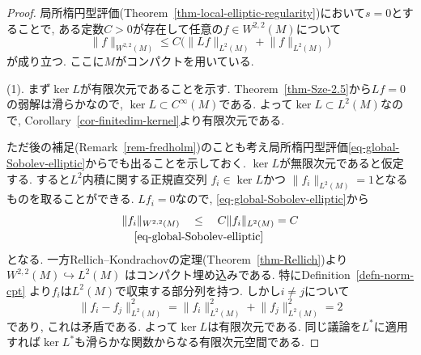 \documentclass[dvipdfmx,a4paper,11pt]{article} %
\theoremstyle{definition}
\theoremstyle{remark}
\numberwithin{equation}{section}
\newcommand{\underalign}[2]{%
  \quad
  \underset{\mathclap{\raisebox{-1.6ex}{\ensuremath{\scriptstyle #1}}}}{#2}
  \quad
}
\begin{document}
\begin{proof}
局所楕円型評価(Theorem~\ref{thm-local-elliptic-regularity})において$s=0$とすることで, ある定数$C>0$が存在して任意の$f\in W^{2,2}(M)$について
\begin{equation}
\label{eq-global-Sobolev-elliptic}
\lVert f\rVert_{W^{2,2}(M)}
\leq
C\bigl(
\lVert Lf\rVert_{L^2(M)}
+
\lVert f\rVert_{L^2(M)}
\bigr)
\end{equation}
が成り立つ. ここに$M$がコンパクトを用いている. 

(1). まず$\ker L$が有限次元であることを示す. 
Theorem~\ref{thm-Sze-2.5}から$Lf=0$の弱解は滑らかなので, 
$\ker L\subset C^\infty(M)$である. 
よって$\ker L\subset L^2(M)$なので, Corollary~\ref{cor-finitedim-kernel}より有限次元である. 

ただ後の補足(Remark~\ref{rem-fredholm})のことも考え局所楕円型評価\eqref{eq-global-Sobolev-elliptic}からでも出ることを示しておく. 
$\ker L$が無限次元であると仮定する. 
すると$L^2$内積に関する正規直交列
\(
f_i\in\ker L\)かつ
\(\lVert f_i\rVert_{L^2(M)}=1
\)となるものを取ることができる. 
$Lf_i=0$なので, \eqref{eq-global-Sobolev-elliptic}から
\[
\lVert f_i\rVert_{W^{2,2}(M)}
\underalign{\eqref{eq-global-Sobolev-elliptic}}{\leq}
C\lVert f_i\rVert_{L^2(M)}
=C
\]
となる. 
一方Rellich--Kondrachovの定理(Theorem~\ref{thm-Rellich})より
\(
W^{2,2}(M)\hookrightarrow L^2(M)
\)
はコンパクト埋め込みである. 特にDefinition~\ref{defn-norm-cpt}
より$f_i$は$L^2(M)$で収束する部分列を持つ. 
しかし$i\neq j$について
\[
\lVert f_i-f_j\rVert_{L^2(M)}^2
=
\lVert f_i\rVert_{L^2(M)}^2
+
\lVert f_j\rVert_{L^2(M)}^2
=
2
\]
であり, これは矛盾である. 
よって$\ker L$は有限次元である. 
同じ議論を$L^*$に適用すれば$\ker L^*$も滑らかな関数からなる有限次元空間である. 



\end{proof}
\end{document}
